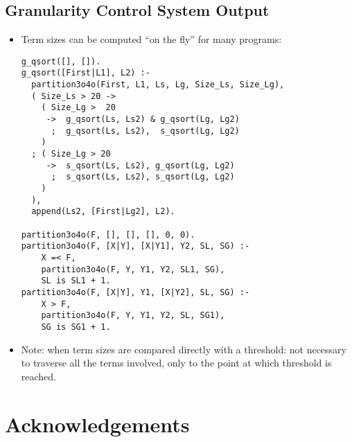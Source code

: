 \documentclass{article}
\renewcommand{\_}{\char'137}
\begin{document}
\subsection{Granularity Control System Output}
\begin{itemize}

\item Term sizes can be computed ``on the fly'' for many programs:
\begin{verbatim}
g_qsort([], []).
g_qsort([First|L1], L2) :-
  partition3o4o(First, L1, Ls, Lg, Size_Ls, Size_Lg),
  ( Size_Ls > 20 -> 
    ( Size_Lg >  20 
     ->  g_qsort(Ls, Ls2) & g_qsort(Lg, Lg2)
      ;  g_qsort(Ls, Ls2),  s_qsort(Lg, Lg2)
    )
  ; ( Size_Lg > 20 
     ->  s_qsort(Ls, Ls2), g_qsort(Lg, Lg2)
      ;  s_qsort(Ls, Ls2), s_qsort(Lg, Lg2)
    )
  ),
  append(Ls2, [First|Lg2], L2).

partition3o4o(F, [], [], [], 0, 0).
partition3o4o(F, [X|Y], [X|Y1], Y2, SL, SG) :- 
    X =< F, 
    partition3o4o(F, Y, Y1, Y2, SL1, SG), 
    SL is SL1 + 1.
partition3o4o(F, [X|Y], Y1, [X|Y2], SL, SG) :- 
    X > F,  
    partition3o4o(F, Y, Y1, Y2, SL, SG1), 
    SG is SG1 + 1.
\end{verbatim}

\item Note: when term sizes are compared directly with a
       threshold:  not necessary to traverse all the terms involved,
       only to the point at which threshold is reached.
\end{itemize}

\newpage
\section*{Acknowledgements}
\end{document}
